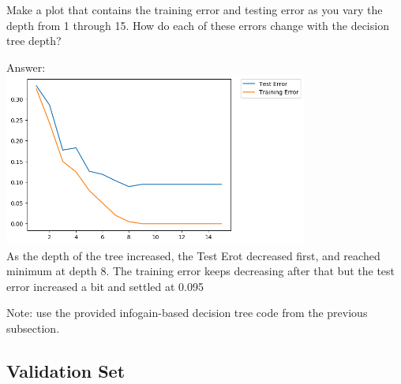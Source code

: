 \documentclass{article}
\def\ans#1{\par\gre{Answer: #1}}
\def\blu#1{{\color{blu}#1}}
\def\gre#1{{\color{gre}#1}}
\begin{document}
\blu{Make a plot that contains the training error and testing error as you vary the depth from 1 through 15. How do each of these errors change with the decision tree depth?}
\ans{\\
\includegraphics[width = 10cm]{Q1TrainVSTest2.png}\\
As the depth of the tree increased, the Test Erot decreased first, and reached minimum at depth 8. The training error keeps decreasing after that but the test error increased a bit and settled at 0.095 }

Note: use the provided infogain-based decision tree code from the previous subsection.



\subsection{Validation Set}
\end{document}
